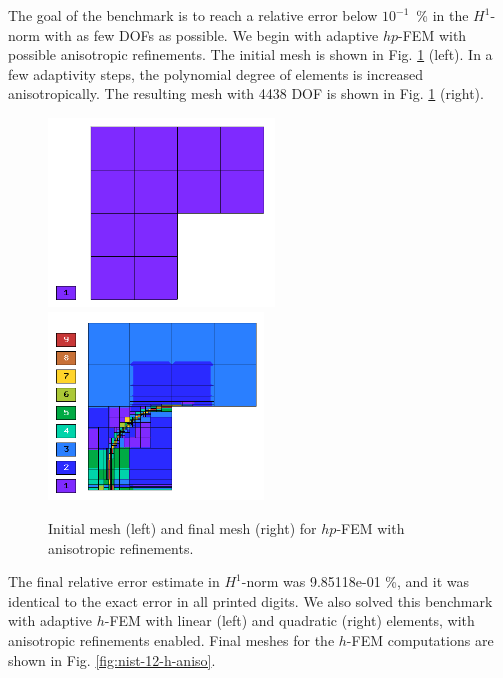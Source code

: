 The goal of the benchmark is to reach a relative error below
$10^{-1}$~\% in the $H^1$-norm with as few DOFs as possible.
We begin with adaptive $hp$-FEM with possible anisotropic refinements.
The initial mesh is shown in Fig. \ref{fig:nist-12-hp-aniso} (left).
In a few adaptivity steps, the polynomial degree of elements is increased
anisotropically.
The resulting mesh with 4438 DOF is shown in Fig. \ref{fig:nist-12-hp-aniso} (right).

\begin{figure}[!ht]
\centering
\includegraphics[height=5cm]{nist/nist-12/mesh_hp_aniso_init.png}\ \
\includegraphics[height=5cm]{nist/nist-12/mesh_hp_aniso.png}
\vspace{-2mm}
\caption{Initial mesh (left) and final mesh (right) for $hp$-FEM with anisotropic refinements.}
\label{fig:nist-12-hp-aniso}
\end{figure}

The final relative error estimate in $H^1$-norm was 9.85118e-01 \%,
and it was identical to the exact error in all printed digits.
We also solved this benchmark with adaptive $h$-FEM
with linear (left) and quadratic (right)
elements, with anisotropic refinements enabled.
Final meshes for the $h$-FEM computations are shown
in Fig. \ref{fig:nist-12-h-aniso}.

